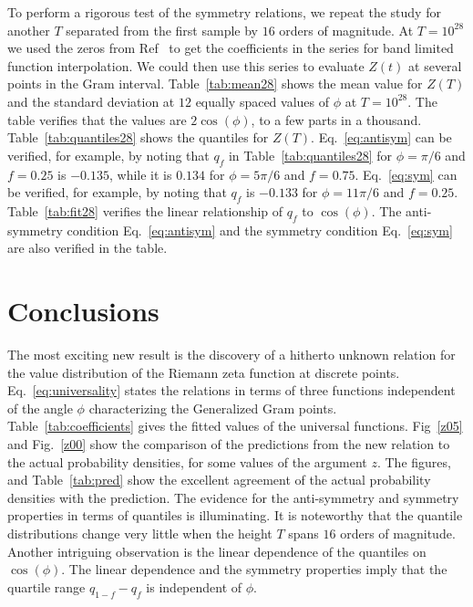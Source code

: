 \documentclass[twoside]{article}
\begin{document}
To perform a rigorous test of the symmetry relations, we repeat the study for another $T$ separated from the first sample by $16$ orders of magnitude. At $T=10^{28}$ we used the  zeros from Ref~\cite{hiary 2010} to get the coefficients in the series for band limited function interpolation. We could then use this series to evaluate  $Z(t)$  at several points in the Gram interval.
Table~\ref{tab:mean28} shows the mean value for $Z(T)$  and the standard deviation at $12$ equally spaced values of $\phi$ at $T=10^{28}$. The table verifies that the values are $2\cos(\phi)$, to a few parts in a thousand. Table~\ref{tab:quantiles28} shows the quantiles for $Z(T)$.  Eq.~\ref{eq:antisym} can be verified, for example, by noting that $q_f$ in Table~\ref{tab:quantiles28}
for $\phi=\pi/6$ and $f=0.25$ is $-0.135$, while it is $0.134$ for $\phi=5\pi/6$ and $f=0.75$. Eq.~\ref{eq:sym} can be verified, for example, by noting that $q_f$ is $-0.133$ for $\phi=11\pi/6$ and $f=0.25$. Table~\ref{tab:fit28} verifies the linear relationship of $q_f$ to $\cos(\phi)$. The anti-symmetry condition Eq.~\ref{eq:antisym}  and the symmetry condition Eq.~\ref{eq:sym} are also verified in the table.


\section{\label{conclusions}Conclusions}

The most exciting new result is the discovery of a hitherto unknown relation for the 
value distribution of the Riemann zeta function at discrete points. Eq.~\ref{eq:universality}
states the relations in terms of three functions independent of the angle $\phi$
characterizing the Generalized Gram points. Table~\ref{tab:coefficients} gives the fitted values 
of the universal functions.
Fig~\ref{z05} and Fig.~\ref{z00} show the comparison of the predictions from the new 
relation to the actual probability densities, for some values of the argument $z$. The figures, and 
Table~\ref{tab:pred} show the excellent agreement of the actual probability densities with the
 prediction.
The evidence for the anti-symmetry and symmetry properties 
in terms of quantiles is illuminating. 
It is noteworthy that the quantile distributions change very little 
when the height $T$ spans $16$ orders of magnitude. 
Another intriguing observation is the linear dependence of the quantiles 
on $\cos(\phi)$. The linear dependence and the symmetry properties imply that 
the quartile range $q_{1-f}-q_f$ is independent of $\phi$.
\end{document}
